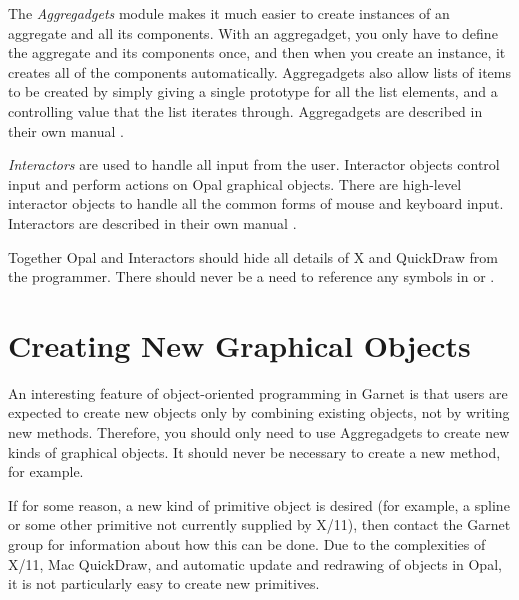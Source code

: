 The {\it Aggregadgets} module makes it much easier to create instances of an
aggregate and all its components.  With an aggregadget, you only have to
define the aggregate and
its components once, and then when you create an instance, it creates all
of the components automatically.  Aggregadgets also allow lists of items to
be created by simply giving a single prototype for all the list elements,
and a controlling value that the list iterates through.  Aggregadgets are
described in their own manual \cite{AggregadgetsManual}.

{\it Interactors} are used to handle all input from the user.  Interactor
objects control input and perform actions on Opal graphical objects.
There are high-level interactor objects to
handle all the common forms of mouse and keyboard input.  Interactors are
described in their own manual \cite{InterManual}.

Together Opal and Interactors should hide all details of X and QuickDraw
from the programmer.  There should never be a need to reference any symbols in
 or .


\chapter{Creating New Graphical Objects}

An interesting feature of object-oriented programming in Garnet is that
users are expected to create new objects only by combining existing
objects, not by writing new methods.  Therefore, you should only need to
use Aggregadgets to create new kinds of graphical objects.  It should never
be necessary to create a new  method, for example.

If for some reason, a new kind of primitive object is desired (for example,
a spline or some other primitive not currently supplied by X/11), then
contact the Garnet group for information about how this can be done.  Due
to the complexities of X/11, Mac QuickDraw, and automatic update and
redrawing of objects in Opal, it is not particularly easy to create
new primitives.

